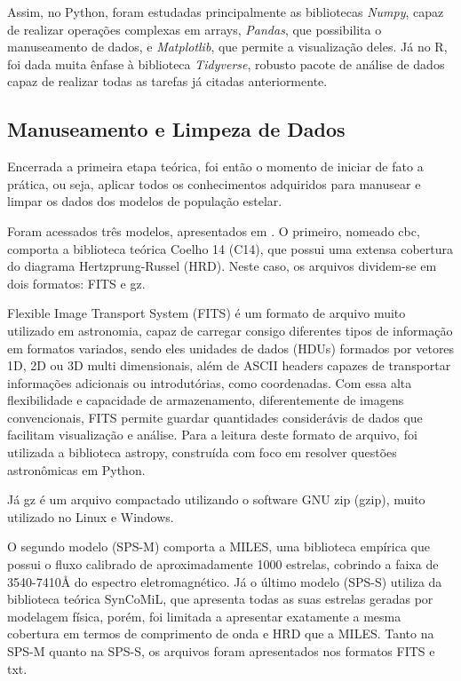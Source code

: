 \documentclass[12pt]{projeto}
\begin{document}
Assim, no Python, foram estudadas principalmente as bibliotecas \textit{Numpy}, capaz de realizar operações complexas em arrays, \textit{Pandas}, que possibilita o manuseamento de dados, e \textit{Matplotlib}, que permite a visualização deles. Já no R, foi dada muita ênfase à biblioteca \textit{Tidyverse}, robusto pacote de análise de dados capaz de realizar todas as tarefas já citadas anteriormente.

\subsection{Manuseamento e Limpeza de Dados}

Encerrada a primeira etapa teórica, foi então o momento de iniciar de fato a prática, ou seja, aplicar todos os conhecimentos adquiridos para manusear e limpar os dados dos modelos de população estelar.

Foram acessados três modelos, apresentados em \cite{Paula2020}. O primeiro, nomeado cbc, comporta a biblioteca teórica Coelho 14 (C14), que possui uma extensa cobertura do diagrama Hertzprung-Russel (HRD). Neste caso, os arquivos dividem-se em dois formatos: FITS e gz. 

Flexible Image Transport System (FITS) é um formato de arquivo muito utilizado em astronomia, capaz de carregar consigo diferentes tipos de informação em formatos variados, sendo eles unidades de dados (HDUs) formados por vetores 1D, 2D ou 3D multi dimensionais, além de ASCII headers capazes de transportar informações adicionais ou introdutórias, como coordenadas. Com essa alta flexibilidade e capacidade de armazenamento, diferentemente de imagens convencionais, FITS permite guardar quantidades considerávis de dados que facilitam visualização e análise. Para a leitura deste formato de arquivo, foi utilizada a biblioteca astropy, construída com foco em resolver questões astronômicas em Python.

Já gz é um arquivo compactado utilizando o software GNU zip (gzip), muito utilizado no Linux e Windows.

O segundo modelo (SPS-M) comporta a MILES, uma biblioteca empírica que possui o fluxo calibrado de aproximadamente
1000 estrelas, cobrindo a faixa de 3540-7410Å do espectro eletromagnético. Já o último modelo (SPS-S) utiliza da biblioteca teórica SynCoMiL, que apresenta todas as suas estrelas geradas por modelagem física, porém, foi limitada a apresentar exatamente a mesma cobertura em termos de comprimento de onda e HRD que a MILES. Tanto na SPS-M quanto na SPS-S, os arquivos foram apresentados nos formatos FITS e txt.
\end{document}
